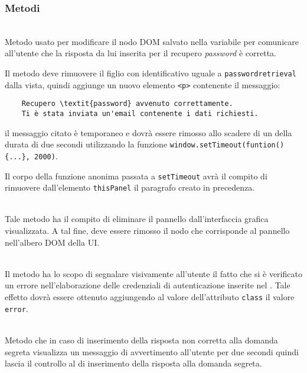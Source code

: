 \subsubsection*{Metodi}
\begin{description}

  \item{}\\
	Metodo usato per modificare il nodo DOM salvato nella variabile  per comunicare all'utente che la risposta da lui inserita per il recupero \textit{password} è corretta. 
	
Il metodo deve rimuovere il figlio con identificativo uguale a \texttt{passwordretrieval} dalla vista, quindi aggiunge un nuovo elemento \verb'<p>' contenente il messaggio:
\begin{verbatim}
	Recupero \textit{password} avvenuto correttamente.
	Ti è stata inviata un'email contenente i dati richiesti.
\end{verbatim}
il messaggio citato è temporaneo e dovrà essere rimosso allo scadere di un  della durata di due secondi utilizzando la funzione \verb'window.setTimeout(funtion() {...}, 2000)'.

Il corpo della funzione anonima passata a \verb'setTimeout' avrà il compito di rimuovere dall'elemento \verb'thisPanel' il paragrafo creato in precedenza.

  \item{}\\
  Tale metodo ha il compito di eliminare il pannello dall'interfaccia grafica visualizzata. A tal fine, deve essere rimosso il nodo che corrisponde al pannello nell'albero DOM della UI\@.
  
  \item{}\\
  Il metodo ha lo scopo di segnalare visivamente all'utente il fatto che si è verificato un errore nell'elaborazione delle credenziali di autenticazione inserite nel . Tale effetto dovrà essere ottenuto aggiungendo al valore dell'attributo \verb+class+ il valore \verb+error+.

	\item{}\\
	Metodo che in caso di inserimento della risposta non corretta alla domanda segreta visualizza un messaggio di avvertimento all'utente per due secondi quindi lascia il controllo al  di inserimento della risposta alla domanda segreta.
	

\end{description}
